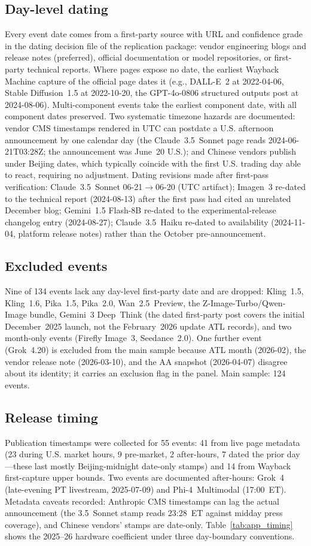 \documentclass[review,12pt,authoryear]{elsarticle}
\begin{document}
\subsection{Day-level dating}
Every event date comes from a first-party source with URL and confidence
grade in the dating decision file of the replication package: vendor engineering blogs and
release notes (preferred), official documentation or model repositories, or
first-party technical reports. Where pages expose no date, the earliest
Wayback Machine capture of the official page dates it (e.g., DALL-E~2 at
2022-04-06, Stable Diffusion~1.5 at 2022-10-20, the GPT-4o-0806 structured
outputs post at 2024-08-06). Multi-component events take the earliest
component date, with all component dates preserved. Two systematic timezone
hazards are documented: vendor CMS timestamps rendered in UTC can postdate a
U.S. afternoon announcement by one calendar day (the Claude~3.5~Sonnet page
reads 2024-06-21T03:28Z; the announcement was June~20 U.S.); and Chinese
vendors publish under Beijing dates, which typically coincide with the first
U.S. trading day able to react, requiring no adjustment. Dating revisions
made after first-pass verification: Claude~3.5~Sonnet 06-21$\to$06-20 (UTC
artifact); Imagen~3 re-dated to the technical report (2024-08-13) after the
first pass had cited an unrelated December blog; Gemini~1.5 Flash-8B re-dated
to the experimental-release changelog entry (2024-08-27); Claude~3.5~Haiku
re-dated to availability (2024-11-04, platform release notes) rather than the
October pre-announcement.

\subsection{Excluded events}
Nine of 134 events lack any day-level first-party date and are dropped:
Kling~1.5, Kling~1.6, Pika~1.5, Pika~2.0, Wan~2.5~Preview, the
Z-Image-Turbo/Qwen-Image bundle, Gemini~3 Deep~Think (the dated first-party
post covers the initial December~2025 launch, not the February~2026 update
ATL records), and two month-only events (Firefly Image~3, Seedance~2.0).
One further event (Grok~4.20) is excluded from the main sample because ATL
month (2026-02), the vendor release note (2026-03-10), and the AA snapshot
(2026-04-07) disagree about its identity; it carries an exclusion flag in the
panel. Main sample: 124 events.

\subsection{Release timing}
Publication timestamps were collected for 55 events: 41 from live page
metadata (23 during U.S. market hours, 9 pre-market, 2 after-hours, 7 dated
the prior day---these last mostly Beijing-midnight date-only stamps) and 14
from Wayback first-capture upper bounds. Two events are documented
after-hours: Grok~4 (late-evening PT livestream, 2025-07-09) and
Phi-4~Multimodal (17:00~ET). Metadata caveats recorded: Anthropic CMS
timestamps can lag the actual announcement (the 3.5~Sonnet stamp reads
23:28~ET against midday press coverage), and Chinese vendors' stamps are
date-only. Table~\ref{tab:app_timing} shows the 2025--26 hardware
coefficient under three day-boundary conventions.
\end{document}
